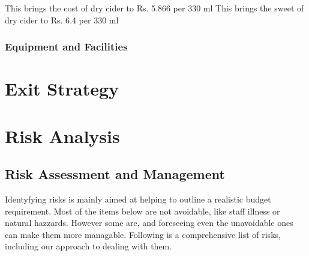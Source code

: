 \documentclass[11pt]{article}
\begin{document}
This brings the cost of dry cider to Rs. 5.866 per 330 ml
This brings the sweet of dry cider to Rs. 6.4 per 330 ml

\subsubsection{Equipment and Facilities}
\newpage

\section{Exit Strategy}

\newpage
\section{Risk Analysis}

  \subsection{Risk Assessment and Management}
  Identyfying risks is mainly aimed at helping to outline a realistic budget requirement. Most of the items below are not avoidable, like staff illness or natural hazzards. However some are, and foreseeing even the unavoidable ones can make them more managable. Following is a comprehensive list of risks, including our approach to dealing with them.
\end{document}
